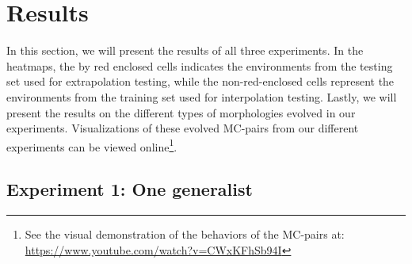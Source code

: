 \section{Results}
    In this section, we will present the results of all three experiments. In the heatmaps, the by red enclosed cells indicates the environments from the testing set used for extrapolation testing, while the non-red-enclosed cells represent the environments from the training set used for interpolation testing. Lastly, we will present the results on the different types of morphologies evolved in our experiments. Visualizations of these evolved MC-pairs from our different experiments can be viewed online\footnote{See the visual demonstration of the behaviors of the MC-pairs at: \url{https://www.youtube.com/watch?v=CWxKFhSb94I}}.
    \subsection{Experiment 1: One generalist}
